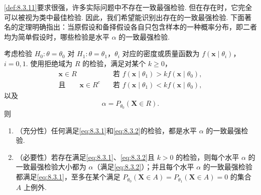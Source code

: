 \autoref{def:8.3.11}要求很强，许多实际问题中不存在一致最强检验. 但在存在时，它完全可以被视为类中最佳检验. 因此，我们希望能识别出存在的一致最强检验. 下面著名的定理明确指出：当原假设和备择假设各自只包含样本的一种概率分布，即二者均为简单假设时，哪些检验是水平 $\alpha$ 的一致最强检验.
\begin{theorem}\label{thm:8.3.12}
考虑检验 $H_0:\theta=\theta_0$ 对 $H_1:\theta=\theta_1$，$\theta_i$ 对应的密度或质量函数为 $f(\boldsymbol x\mid\theta_i)$，$i=0,1$. 使用拒绝域为 $R$ 的检验，满足对某个 $k\ge0$，
\begin{equation}\label{eq:8.3.1}
\begin{aligned}
\boldsymbol x\in R&\quad\text{若 }f(\boldsymbol x\mid\theta_1)>kf(\boldsymbol x\mid\theta_0),\\
\text{且}\qquad\boldsymbol x\in R^c&\quad\text{若 }f(\boldsymbol x\mid\theta_1)<kf(\boldsymbol x\mid\theta_0),
\end{aligned}
\end{equation}
以及
\begin{equation}\label{eq:8.3.2}\alpha=P_{\theta_0}(\boldsymbol X\in R).\end{equation}
则
\begin{enumerate}
\item{}\label{itm:thm:8.3.12:a}（充分性）任何满足\eqref{eq:8.3.1}和\eqref{eq:8.3.2}的检验，都是水平 $\alpha$ 的一致最强检验.
\item{}\label{itm:thm:8.3.12:b}（必要性）若存在满足\eqref{eq:8.3.1}、\eqref{eq:8.3.2}且 $k>0$ 的检验，则每个水平 $\alpha$ 的一致最强检验大小都为 $\alpha$（满足\eqref{eq:8.3.2}）；并且每个水平 $\alpha$ 的一致最强检验都满足\eqref{eq:8.3.1}，至多在某个满足 $P_{\theta_0}(\boldsymbol X\in A)=P_{\theta_1}(\boldsymbol X\in A)=0$ 的集合 $A$ 上例外.
\end{enumerate}
\end{theorem}
